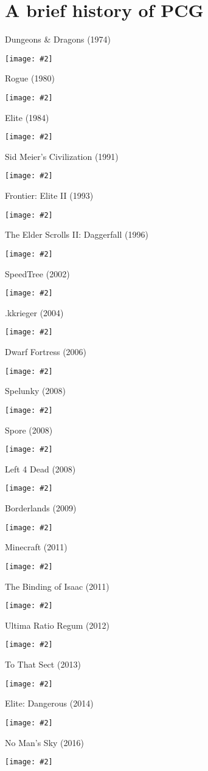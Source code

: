 \part{A brief history of PCG}
\frame{\partpage}

\newcommand{\pictureslideb}[3]{
	\begin{frame}{#1}
		\begin{center}
			#3
			
			\vspace{6pt}
			
			\texttt{[image: \#2]}
		\end{center}
	\end{frame}
}

\newcommand{\pictureslide}[2]{
	\begin{frame}{#1}
		\begin{center}
			\texttt{[image: \#2]}
		\end{center}
	\end{frame}
}

\pictureslide{Dungeons \& Dragons (1974)}{dnd}
\pictureslide{Rogue (1980)}{rogue}
\pictureslide{Elite (1984)}{elite}
\pictureslide{Sid Meier's Civilization (1991)}{civilization}
\pictureslide{Frontier: Elite II (1993)}{frontier}
\pictureslide{The Elder Scrolls II: Daggerfall (1996)}{daggerfall}
\pictureslide{SpeedTree (2002)}{speedtree}
\pictureslide{.kkrieger (2004)}{kkrieger}
\pictureslide{Dwarf Fortress (2006)}{dwarffortress}
\pictureslide{Spelunky (2008)}{spelunky}
\pictureslide{Spore (2008)}{spore}
\pictureslide{Left 4 Dead (2008)}{left4dead}
\pictureslide{Borderlands (2009)}{borderlands}
\pictureslide{Minecraft (2011)}{minecraft}
\pictureslide{The Binding of Isaac (2011)}{isaac}
\pictureslide{Ultima Ratio Regum (2012)}{ultimaratioregum}
\pictureslide{To That Sect (2013)}{tothatsect}
\pictureslide{Elite: Dangerous (2014)}{elitedangerous}
\pictureslide{No Man's Sky (2016)}{nomanssky}
